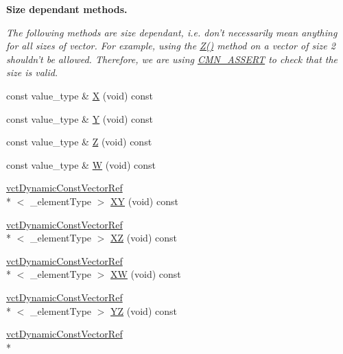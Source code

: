 \begin{Indent}{\bf Size dependant methods.}\par
{\em The following methods are size dependant, i.\-e. don't necessarily mean anything for all sizes of vector. For example, using the \hyperlink{classvct_dynamic_const_vector_base_a8f882cd25d9c932945f5236436924fcf}{Z()} method on a vector of size 2 shouldn't be allowed. Therefore, we are using \hyperlink{group__cisst_common_ga6a12b7031ea38ac5bf5937b8633c97ff}{C\-M\-N\-\_\-\-A\-S\-S\-E\-R\-T} to check that the size is valid. }\begin{DoxyCompactItemize}
\item 
const value\-\_\-type \& \hyperlink{classvct_dynamic_const_vector_base_ae48d3b96ad2a924d48d1667f4e03156d}{X} (void) const 
\item 
const value\-\_\-type \& \hyperlink{classvct_dynamic_const_vector_base_aac9f4d42ffdb53be61fd3520aaed24a9}{Y} (void) const 
\item 
const value\-\_\-type \& \hyperlink{classvct_dynamic_const_vector_base_a8f882cd25d9c932945f5236436924fcf}{Z} (void) const 
\item 
const value\-\_\-type \& \hyperlink{classvct_dynamic_const_vector_base_a4213d8edb802ea8948e62874da796762}{W} (void) const 
\item 
\hyperlink{classvct_dynamic_const_vector_ref}{vct\-Dynamic\-Const\-Vector\-Ref}\\*
$<$ \-\_\-element\-Type $>$ \hyperlink{classvct_dynamic_const_vector_base_add731c945a268967857a0670e0f1a89d}{X\-Y} (void) const 
\item 
\hyperlink{classvct_dynamic_const_vector_ref}{vct\-Dynamic\-Const\-Vector\-Ref}\\*
$<$ \-\_\-element\-Type $>$ \hyperlink{classvct_dynamic_const_vector_base_a8b22fdde3369fb5742b4bb98f1eb83cc}{X\-Z} (void) const 
\item 
\hyperlink{classvct_dynamic_const_vector_ref}{vct\-Dynamic\-Const\-Vector\-Ref}\\*
$<$ \-\_\-element\-Type $>$ \hyperlink{classvct_dynamic_const_vector_base_a1577e0a5abc6f5348dbf6787896b490f}{X\-W} (void) const 
\item 
\hyperlink{classvct_dynamic_const_vector_ref}{vct\-Dynamic\-Const\-Vector\-Ref}\\*
$<$ \-\_\-element\-Type $>$ \hyperlink{classvct_dynamic_const_vector_base_a3d2c554ea19295b3139737ed45edf819}{Y\-Z} (void) const 
\item 
\hyperlink{classvct_dynamic_const_vector_ref}{vct\-Dynamic\-Const\-Vector\-Ref}\\*

\end{DoxyCompactItemize}
\end{Indent}
